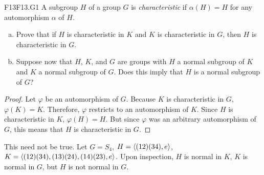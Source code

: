 \documentclass[../AlgebraQualSolutions.tex]{subfiles}
\begin{document}
	\begin{prob}{F13}{F13.G1}
		A subgroup $H$ of a group $G$ is \emph{characteristic} if $\alpha(H) = H$ for any automorphism $\alpha$ of $H$.
		
		\begin{enumerate}[(a)]
			\item Prove that if $H$ is characteristic in $K$ and $K$ is characteristic in $G$, then $H$ is characteristic in $G$.
			\item Suppose now that $H$, $K$, and $G$ are groups with $H$ a normal subgroup of $K$ and $K$ a normal subgroup of $G$. Does this imply that $H$ is a normal subgroup of $G$?
		\end{enumerate}
	\end{prob}
	
	\begin{proof}
		Let $\varphi$ be an automorphism of $G$. Because $K$ is characteristic in $G$, $\varphi(K) = K$. Therefore, $\varphi$ restricts to an automorphism of $K$. Since $H$ is characteristic in $K$, $\varphi(H) = H$. But since $\varphi$ was an arbitrary automorphism of $G$, this means that $H$ is characteristic in $G$.
	\end{proof}
	
	\begin{solution}
	This need not be true. Let $G = S_4$, $H = \left\langle (12)(34),e \right\rangle$, $K = \left\langle (12)(34), (13)(24),(14)(23), e \right\rangle$. Upon inspection, $H$ is normal in $K$, $K$ is normal in $G$, but $H$ is not normal in $G$.
	\end{solution}
\end{document}
